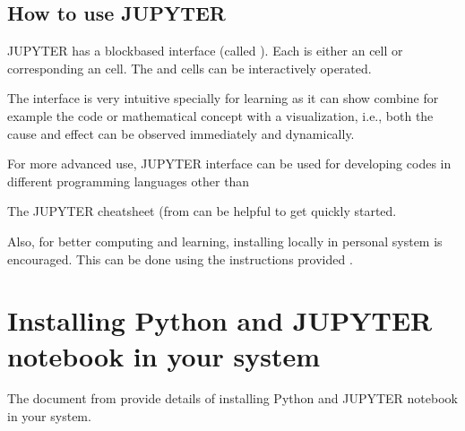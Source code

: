 \documentclass[letterpaper,10pt,english]{sphinxmanual}
\let\sphinxpxdimen\pdfpxdimen\else\newdimen\sphinxpxdimen
\begin{document}
\subsection{How to use JUPYTER}
\label{\detokenize{contents/tutorials/tutorial_01/02_jupyter:how-to-use-jupyter}}
JUPYTER has a block\sphinxhyphen{}based interface (called ). Each  is either an  cell or corresponding an   cell. The  and  cells can be interactively operated.

\noindent\sphinxincludegraphics[width=600\sphinxpxdimen]{{bg2_f11}.png}

The  interface is very intuitive specially for learning as it can show combine for example the code or mathematical concept with a visualization, i.e., both the cause and effect can be observed immediately and dynamically.

\noindent\sphinxincludegraphics[width=600\sphinxpxdimen]{{bg2_f21}.png}

For more advanced use, JUPYTER interface can be used for developing codes in different programming languages other than 

The JUPYTER cheat\sphinxhyphen{}sheet (from \sphinxhref{https://datacamp-community-prod.s3.amazonaws.com/48093c40-5303-45f4-bbf9-0c96c0133c40}{here}{]} can be helpful to get quickly started.

Also, for better computing and learning, installing  locally in personal system is encouraged. This can be done using the instructions provided .


\section{Installing Python and JUPYTER notebook in your system}
\label{\detokenize{contents/tutorials/tutorial_01/02_jupyter:installing-python-and-jupyter-notebook-in-your-system}}
The document from  provide details of installing Python and JUPYTER notebook in your system.

\begin{sphinxVerbatim}[commandchars=\\\{\}]
   
    
   
   
\end{sphinxVerbatim}
\end{document}

